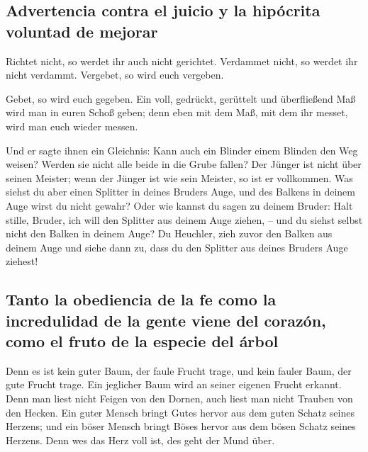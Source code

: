 \hypertarget{advertencia-contra-el-juicio-y-la-hipuxf3crita-voluntad-de-mejorar}{%
\subsection{Advertencia contra el juicio y la hipócrita voluntad de
mejorar}\label{advertencia-contra-el-juicio-y-la-hipuxf3crita-voluntad-de-mejorar}}

 Richtet nicht, so werdet ihr auch nicht gerichtet.
Verdammet nicht, so werdet ihr nicht verdammt. Vergebet, so wird euch
vergeben.

 Gebet, so wird euch gegeben. Ein voll, gedrückt,
gerüttelt und überfließend Maß wird man in euren Schoß geben; denn eben
mit dem Maß, mit dem ihr messet, wird man euch wieder messen.

 Und er sagte ihnen ein Gleichnis: Kann auch ein Blinder
einem Blinden den Weg weisen? Werden sie nicht alle beide in die Grube
fallen?  Der Jünger ist nicht über seinen Meister; wenn
der Jünger ist wie sein Meister, so ist er vollkommen. 
Was siehst du aber einen Splitter in deines Bruders Auge, und des
Balkens in deinem Auge wirst du nicht gewahr?  Oder wie
kannst du sagen zu deinem Bruder: Halt stille, Bruder, ich will den
Splitter aus deinem Auge ziehen, -- und du siehst selbst nicht den
Balken in deinem Auge? Du Heuchler, zieh zuvor den Balken aus deinem
Auge und siehe dann zu, dass du den Splitter aus deines Bruders Auge
ziehest!

\hypertarget{tanto-la-obediencia-de-la-fe-como-la-incredulidad-de-la-gente-viene-del-corazuxf3n-como-el-fruto-de-la-especie-del-uxe1rbol}{%
\subsection{Tanto la obediencia de la fe como la incredulidad de la
gente viene del corazón, como el fruto de la especie del
árbol}\label{tanto-la-obediencia-de-la-fe-como-la-incredulidad-de-la-gente-viene-del-corazuxf3n-como-el-fruto-de-la-especie-del-uxe1rbol}}

 Denn es ist kein guter Baum, der faule Frucht trage, und
kein fauler Baum, der gute Frucht trage.  Ein jeglicher
Baum wird an seiner eigenen Frucht erkannt. Denn man liest nicht Feigen
von den Dornen, auch liest man nicht Trauben von den Hecken.
 Ein guter Mensch bringt Gutes hervor aus dem guten
Schatz seines Herzens; und ein böser Mensch bringt Böses hervor aus dem
bösen Schatz seines Herzens. Denn wes das Herz voll ist, des geht der
Mund über.

